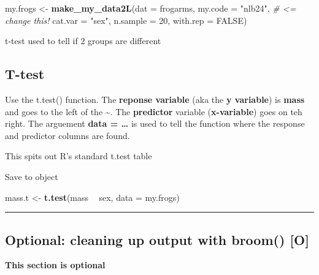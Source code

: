 \documentclass[]{book}
\newenvironment{Shaded}{\begin{snugshade}}{\end{snugshade}}
\newcommand{\KeywordTok}[1]{\textcolor[rgb]{0.13,0.29,0.53}{\textbf{#1}}}
\newcommand{\DataTypeTok}[1]{\textcolor[rgb]{0.13,0.29,0.53}{#1}}
\newcommand{\DecValTok}[1]{\textcolor[rgb]{0.00,0.00,0.81}{#1}}
\newcommand{\StringTok}[1]{\textcolor[rgb]{0.31,0.60,0.02}{#1}}
\newcommand{\CommentTok}[1]{\textcolor[rgb]{0.56,0.35,0.01}{\textit{#1}}}
\newcommand{\OtherTok}[1]{\textcolor[rgb]{0.56,0.35,0.01}{#1}}
\newcommand{\OperatorTok}[1]{\textcolor[rgb]{0.81,0.36,0.00}{\textbf{#1}}}
\newcommand{\NormalTok}[1]{#1}
\theoremstyle{definition}
\theoremstyle{definition}
\theoremstyle{definition}
\theoremstyle{remark}
\begin{document}
\begin{Shaded}
\begin{Highlighting}[]
\NormalTok{my.frogs <-}\StringTok{ }\KeywordTok{make_my_data2L}\NormalTok{(}\DataTypeTok{dat =}\NormalTok{ frogarms, }
                           \DataTypeTok{my.code =} \StringTok{"nlb24"}\NormalTok{, }\CommentTok{# <=  change this!}
                           \DataTypeTok{cat.var =} \StringTok{"sex"}\NormalTok{,}
                           \DataTypeTok{n.sample =} \DecValTok{20}\NormalTok{, }
                           \DataTypeTok{with.rep =} \OtherTok{FALSE}\NormalTok{)}
\end{Highlighting}
\end{Shaded}

t-test used to tell if 2 groups are different

\subsection{T-test}\label{t-test}

Use the t.test() function. The \textbf{reponse variable} (aka the
\textbf{y variable}) is \textbf{mass} and goes to the left of the
\textbf{\textasciitilde{}}. The \textbf{predictor} variable
(\textbf{x-variable}) goes on teh right. The arguement \textbf{data =
\ldots{}} is used to tell the function where the response and predictor
columns are found.

This spits out R's standard t.test table

Save to object

\begin{Shaded}
\begin{Highlighting}[]
\NormalTok{mass.t <-}\StringTok{  }\KeywordTok{t.test}\NormalTok{(mass }\OperatorTok{~}\StringTok{ }\NormalTok{sex, }\DataTypeTok{data =}\NormalTok{ my.frogs)}
\end{Highlighting}
\end{Shaded}

\begin{center}\rule{0.5\linewidth}{\linethickness}\end{center}

\subsection{Optional: cleaning up output with broom()
{[}O{]}}\label{optional-cleaning-up-output-with-broom-o}

\textbf{This section is optional}
\end{document}
